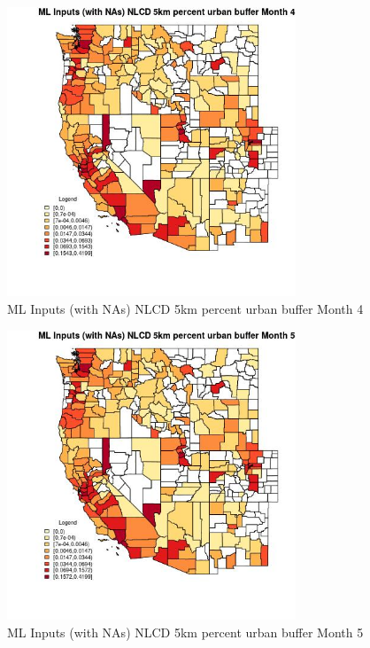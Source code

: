 \begin{figure} 
\centering  
\includegraphics[width=0.77\textwidth]{Code_Outputs/Report_ML_input_PM25_Step4_part_f_de_duplicated_aveswNAs_CountyNLCD_5km_percent_urban_buffermedianMonth4.jpg} 
\caption{\label{fig:Report_ML_input_PM25_Step4_part_f_de_duplicated_aveswNAsCountyNLCD_5km_percent_urban_buffermedianMonth4}ML Inputs (with NAs) NLCD 5km percent urban buffer Month 4} 
\end{figure} 
 

\begin{figure} 
\centering  
\includegraphics[width=0.77\textwidth]{Code_Outputs/Report_ML_input_PM25_Step4_part_f_de_duplicated_aveswNAs_CountyNLCD_5km_percent_urban_buffermedianMonth5.jpg} 
\caption{\label{fig:Report_ML_input_PM25_Step4_part_f_de_duplicated_aveswNAsCountyNLCD_5km_percent_urban_buffermedianMonth5}ML Inputs (with NAs) NLCD 5km percent urban buffer Month 5} 
\end{figure} 
 


